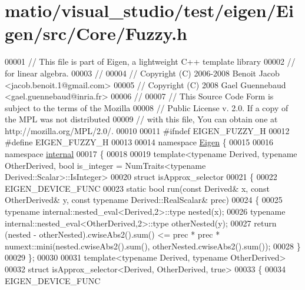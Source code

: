 \hypertarget{matio_2visual__studio_2test_2eigen_2_eigen_2src_2_core_2_fuzzy_8h_source}{}\section{matio/visual\+\_\+studio/test/eigen/\+Eigen/src/\+Core/\+Fuzzy.h}
\label{matio_2visual__studio_2test_2eigen_2_eigen_2src_2_core_2_fuzzy_8h_source}

\begin{DoxyCode}
00001 \textcolor{comment}{// This file is part of Eigen, a lightweight C++ template library}
00002 \textcolor{comment}{// for linear algebra.}
00003 \textcolor{comment}{//}
00004 \textcolor{comment}{// Copyright (C) 2006-2008 Benoit Jacob <jacob.benoit.1@gmail.com>}
00005 \textcolor{comment}{// Copyright (C) 2008 Gael Guennebaud <gael.guennebaud@inria.fr>}
00006 \textcolor{comment}{//}
00007 \textcolor{comment}{// This Source Code Form is subject to the terms of the Mozilla}
00008 \textcolor{comment}{// Public License v. 2.0. If a copy of the MPL was not distributed}
00009 \textcolor{comment}{// with this file, You can obtain one at http://mozilla.org/MPL/2.0/.}
00010 
00011 \textcolor{preprocessor}{#ifndef EIGEN\_FUZZY\_H}
00012 \textcolor{preprocessor}{#define EIGEN\_FUZZY\_H}
00013 
00014 \textcolor{keyword}{namespace }\hyperlink{namespace_eigen}{Eigen} \{ 
00015 
00016 \textcolor{keyword}{namespace }\hyperlink{namespaceinternal}{internal}
00017 \{
00018 
00019 template<typename Derived, typename OtherDerived, bool is\_integer = NumTraits<typename
       Derived::Scalar>::IsInteger>
00020 \textcolor{keyword}{struct }isApprox\_selector
00021 \{
00022   EIGEN\_DEVICE\_FUNC
00023   \textcolor{keyword}{static} \textcolor{keywordtype}{bool} run(\textcolor{keyword}{const} Derived& x, \textcolor{keyword}{const} OtherDerived& y, \textcolor{keyword}{const} \textcolor{keyword}{typename} Derived::RealScalar& prec)
00024   \{
00025     \textcolor{keyword}{typename} internal::nested\_eval<Derived,2>::type nested(x);
00026     \textcolor{keyword}{typename} internal::nested\_eval<OtherDerived,2>::type otherNested(y);
00027     \textcolor{keywordflow}{return} (nested - otherNested).cwiseAbs2().sum() <= prec * prec * numext::mini(nested.cwiseAbs2().sum(),
       otherNested.cwiseAbs2().sum());
00028   \}
00029 \};
00030 
00031 \textcolor{keyword}{template}<\textcolor{keyword}{typename} Derived, \textcolor{keyword}{typename} OtherDerived>
00032 \textcolor{keyword}{struct }isApprox\_selector<Derived, OtherDerived, true>
00033 \{
00034   EIGEN\_DEVICE\_FUNC

\end{DoxyCode}
